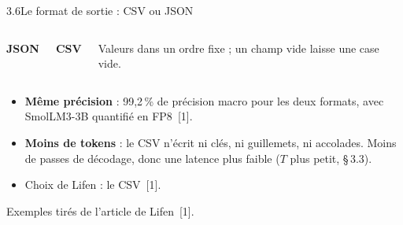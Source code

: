 \documentclass[11pt,aspectratio=169]{beamer}
\newcommand{\refs}[1]{{\color{mlblue}[#1]}}
\newcommand{\pct}[1]{#1\,\%}
\newcommand{\remarque}[1]{{\footnotesize\color{mlgray}#1\par}}
\begin{document}
\begin{frame}{3.6\quad Le format de sortie : CSV ou JSON}
  \begin{columns}[T]
    \textbf{JSON}\par\smallskip
    \textbf{CSV}\par\smallskip

    \smallskip
    {\small Valeurs dans un ordre fixe ; un champ vide laisse une case vide.}
  \end{columns}

  \vspace{1em}
  \small
  \begin{itemize}
    \item \textbf{Même précision} : \pct{99,2} de précision macro pour les deux formats,
      avec SmolLM3-3B quantifié en FP8~\refs{1}.
    \item \textbf{Moins de tokens} : le CSV n'écrit ni clés, ni guillemets, ni accolades. Moins
      de passes de décodage, donc une latence plus faible ($T$ plus petit, §\,3.3).
    \item Choix de Lifen : le CSV~\refs{1}.
  \end{itemize}
  \remarque{Exemples tirés de l'article de Lifen~\refs{1}.}
\end{frame}
\end{document}
